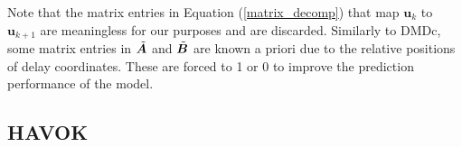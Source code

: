    Note that the matrix entries in Equation (\ref{matrix_decomp}) that map $\bm{u}_k$ to $\bm{u}_{k+1}$ are meaningless for our purposes and are discarded.
    Similarly to DMDc, some matrix entries in $\Tilde{\bm{A}}$ and $\Tilde{\bm{B}}$ are known a priori due to the relative positions of delay coordinates. These are forced to 1 or 0 to improve the prediction performance of the model.

    \subsection{HAVOK}


